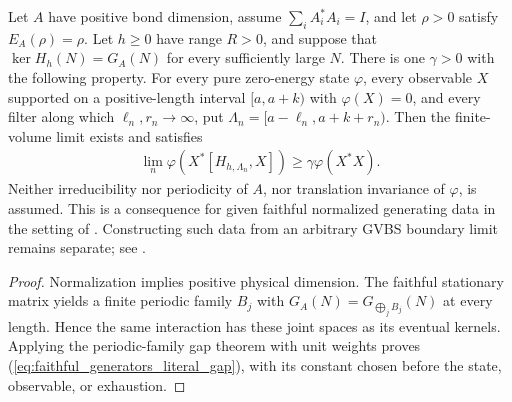 \begin{lemma}
    \label{thm:faithful_generators_quasi_local_gap}
    \leanok
    Let $A$ have positive bond dimension, assume $\sum_iA_i^*A_i=I$, and
    let $\rho>0$ satisfy $E_A(\rho)=\rho$. Let $h\geq0$ have range $R>0$,
    and suppose that $\ker H_h(N)=G_A(N)$ for every sufficiently large $N$.
    There is one $\gamma>0$ with the following property. For every pure
    zero-energy state $\varphi$, every observable $X$ supported on a
    positive-length interval $[a,a+k)$ with $\varphi(X)=0$, and every filter
    along which $\ell_n,r_n\to\infty$, put
    $\Lambda_n=[a-\ell_n,a+k+r_n)$. Then the finite-volume limit
    exists and satisfies
    \begin{align}
        \lim_n\varphi\!\left(X^*[H_{h,\Lambda_n},X]\right)
        \geq\gamma\varphi(X^*X).
        \label{eq:faithful_generators_literal_gap}
    \end{align}
    Neither irreducibility nor periodicity of $A$, nor translation
    invariance of $\varphi$, is assumed. This is a consequence for given
    faithful normalized generating data in the setting of
    \cite[Theorem~1.2 and Sections~3,~6]{Nachtergaele1996Spectral}.
    Constructing such data from an arbitrary GVBS boundary limit remains
    separate; see
    \cite{gap:nachtergaele96_infinite_volume_ground_projection}.
\end{lemma}
\begin{proof}\leanok
    Normalization implies positive physical dimension. The faithful
    stationary matrix yields a finite periodic family $B_j$ with
    $G_A(N)=G_{\bigoplus_jB_j}(N)$ at every length. Hence the same
    interaction has these joint spaces as its eventual kernels. Applying
    the periodic-family gap theorem with unit weights proves
    (\ref{eq:faithful_generators_literal_gap}), with its constant chosen
    before the state, observable, or exhaustion.
\end{proof}

